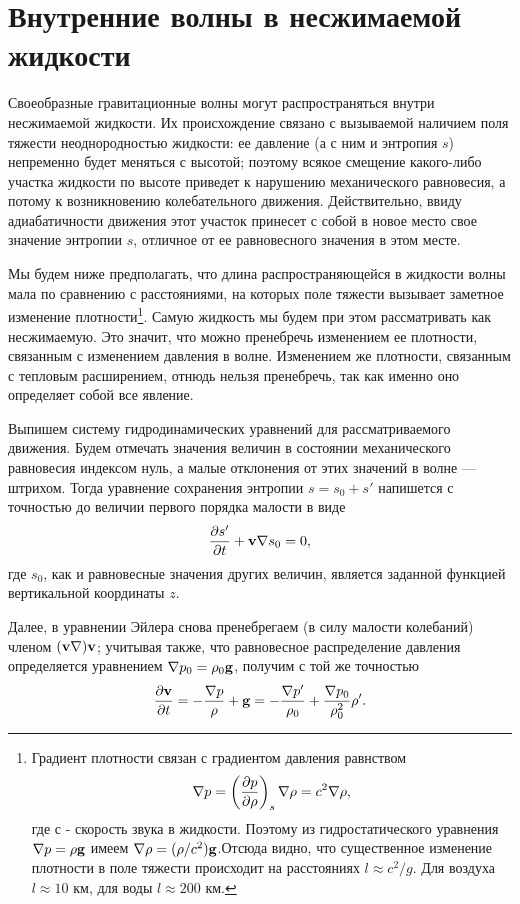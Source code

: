 \section{Внутренние волны в несжимаемой жидкости}
\label{sec:p13}

Своеобразные гравитационные волны могут распространяться внутри несжимаемой
жидкости. Их происхождение связано с вызываемой наличием поля тяжести
неоднородностью жидкости: ее давление (а с ним и энтропия $s$) непременно будет
меняться с высотой; поэтому всякое смещение какого-либо участка жидкости по
высоте приведет к нарушению механического равновесия, а потому к возникновению
колебательного движения. Действительно, ввиду адиабатичности движения этот
участок принесет с собой в новое место свое значение энтропии $s$, отличное от
ее равновесного значения в этом месте.

Мы будем ниже предполагать, что длина распространяющейся в жидкости волны мала
по сравнению с расстояниями, на которых поле тяжести вызывает заметное изменение
плотности\footnote{Градиент плотности связан с градиентом давления равнством
\[
\nabla p = \left( \frac{\partial{p}}{\partial{\rho}} \right)_{s}\nabla \rho = c^2 \nabla \rho,
\]
где $с$ - скорость звука в жидкости. Поэтому из гидростатического уравнения
$\nabla p =\rho \mathbf{g}$ имеем $\nabla \rho = (\rho/c^2)\mathbf{g}$.Отсюда видно,
что существенное изменение плотности в поле тяжести происходит на расстояниях
$l \approx c^2/g$. Для воздуха $l \approx 10$ км, для воды $l \approx 200$ км.
}. Самую жидкость мы будем при этом рассматривать как несжимаемую. Это
значит, что можно пренебречь изменением ее плотности, связанным с изменением
давления в волне. Изменением же плотности, связанным с тепловым расширением,
отнюдь нельзя пренебречь, так как именно оно определяет собой все явление.

Выпишем систему гидродинамических уравнений для рассматриваемого движения. Будем
отмечать значения величин в состоянии механического равновесия индексом нуль, а
малые отклонения от этих значений в волне — штрихом. Тогда уравнение сохранения
энтропии $s = s_0 + s'$ напишется с точностью до величии первого порядка малости
в виде
\begin{equation}
   \label{eq:13.1}
   \frac{\partial{s'}}{\partial{t}} + {\mathbf{v}}\nabla s_0 = 0,
\end{equation}
где $s_0$, как и равновесные значения других величин, является заданной функцией
вертикальной координаты $z$.

Далее, в уравнении Эйлера снова пренебрегаем (в силу малости колебаний) членом
$({\mathbf{v}} \nabla) {\mathbf{v}}$; учитывая также, что равновесное распределение давления определяется
уравнением $\nabla p_0 = \rho_0 \mathbf{g}$, получим с той же точностью
\[
   \frac{\partial{{ \mathbf{v} }}}{\partial{t}} = - \frac{\nabla p}{\rho} + \mathbf{g} =
   - \frac{\nabla p'}{\rho_0} + \frac{\nabla p_0}{\rho_0^2}\rho' .
\]

